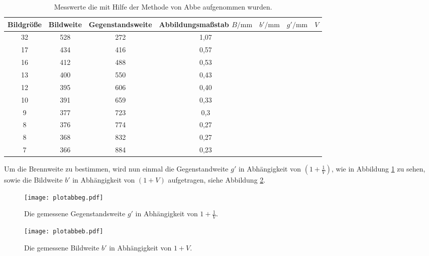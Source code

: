 \begin{table}
    \centering
    \caption{Messwerte die mit Hilfe der Methode von Abbe aufgenommen wurden.}
    \label{tab:abbe}
    \begin{tabular}{c c c c c c c}
    \toprule
    Bildgröße  & Bildweite &Gegenstandsweite & Abbildungsmaßstab
     $B/\si{\milli\meter}$ &$b'/\si{\milli\meter}$ & $g'/\si{\milli\meter}$ &$V$\\
    \midrule
    32  &  528  &  272  & 1,07\\
    17  &  434  &  416  & 0,57\\
    16  &  412  &  488  & 0,53\\
    13  &  400  &  550  & 0,43\\
    12  &  395  &  606  & 0,40\\
    10  &  391  &  659  & 0,33\\
    9   &  377  &  723  & 0,3\\
    8   &  376  &  774  & 0,27\\
    8   &  368  &  832  & 0,27\\
    7   &  366  &  884  & 0,23\\
    \bottomrule
  \end{tabular}
\end{table}
\FloatBarrier
Um die Brennweite zu bestimmen, wird nun einmal
die Gegenstandweite $g'$ in Abhängigkeit von
  $(1+ \frac{1}{V})$, wie in Abbildung \ref{fig:Plotg'} zu sehen,
sowie die Bildweite $b'$ in Abhängigkeit von
$(1+V)$ aufgetragen, siehe Abbildung \ref{fig:Plotb'}.


\begin{figure}
  \centering
  \texttt{[image: plotabbeg.pdf]}
  \caption{Die gemessene Gegenstandsweite $g'$ in Abhängigkeit von $1+\frac{1}{V}$.}
  \label{fig:Plotg'}
\end{figure}

\begin{figure}
 \centering
 \texttt{[image: plotabbeb.pdf]}
 \caption{Die gemessene Bildweite $b'$ in Abhängigkeit von $1+V$.}
 \label{fig:Plotb'}
\end{figure}
\FloatBarrier


